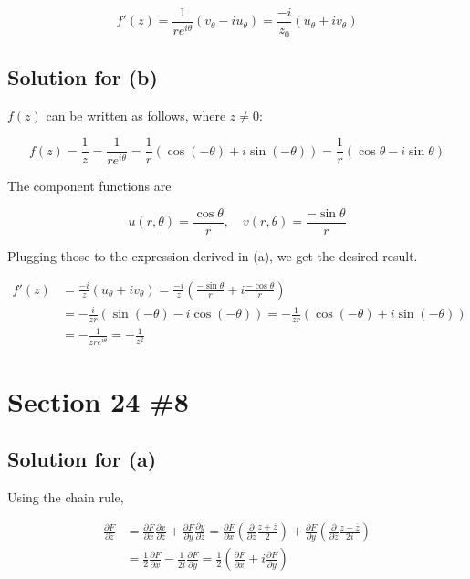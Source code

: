 \documentclass{scrartcl}
\begin{document}
\[
  f'(z) = \frac{1}{re^{i\theta}} (v_\theta - iu_\theta) = \frac{-i}{z_0} (u_\theta + iv_\theta)
\]

\subsection{Solution for (b)}
\(f(z)\) can be written as follows, where \(z \not = 0\):

\[
  f(z) = \frac{1}{z} = \frac{1}{r e^{i\theta}} = \frac{1}{r} (\cos (-\theta) + i\sin (-\theta)) = \frac{1}{r} (\cos \theta - i\sin \theta)
\]

The component functions are

\[
  u(r, \theta) = \frac{\cos \theta}{r}, \quad v(r, \theta) = \frac{-\sin \theta}{r}
\]

Plugging those to the expression derived in (a), we get the desired result.

\begin{align*}
  f'(z) &= \frac{-i}{z} (u_\theta + iv_\theta) = \frac{-i}{z} \left(\frac{-\sin \theta}{r} + i \frac{-\cos \theta}{r}\right) \\
  &= -\frac{i}{zr} \left( \sin(-\theta) - i\cos(-\theta) \right) = -\frac{1}{zr} (\cos(-\theta) + i\sin(-\theta)) \\
  &= -\frac{1}{zre^{i\theta}} = -\frac{1}{z^2}
\end{align*}

\section{Section 24 \#8}
\subsection{Solution for (a)}
Using the chain rule,

\begin{align*}
  \frac{\partial F}{\partial \overline{z}} &= \frac{\partial F}{\partial x} \frac{\partial x}{\partial \overline{z}} + \frac{\partial F}{\partial y} \frac{\partial y}{\partial \overline{z}} = \frac{\partial F}{\partial x} \left( \frac{\partial}{\partial \overline{z}} \frac{z + \overline{z}}{2} \right) + \frac{\partial F}{\partial y} \left( \frac{\partial}{\partial \overline{z}} \frac{z - \overline{z}}{2i} \right) \\
 &= \frac{1}{2} \frac{\partial F}{\partial x} - \frac{1}{2i} \frac{\partial F}{\partial y} = \frac{1}{2} \left( \frac{\partial F}{\partial x} + i \frac{\partial F}{\partial y} \right)
\end{align*}
\end{document}
